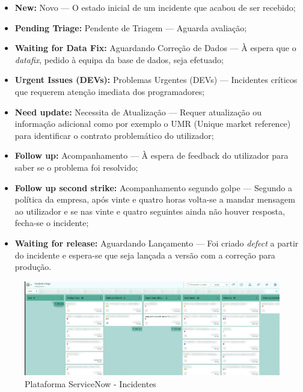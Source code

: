             \begin{itemize}
                \item \textbf{New:} Novo — O estado inicial de um incidente que acabou de ser recebido;
                \item \textbf{Pending Triage:} Pendente de Triagem — Aguarda avaliação;
                \item \textbf{Waiting for Data Fix:} Aguardando Correção de Dados — À espera que o \textit{datafix}, pedido à equipa da base de dados, seja efetuado;
                \item \textbf{Urgent Issues (DEVs):} Problemas Urgentes (DEVs) — Incidentes críticos que requerem atenção imediata dos programadores;
                \item \textbf{Need update:} Necessita de Atualização — Requer atualização ou informação adicional como por exemplo o UMR (Unique market reference) para identificar o contrato problemático do utilizador;
                \item \textbf{Follow up:} Acompanhamento — À espera de feedback do utilizador para saber se o problema foi resolvido;
                \item \textbf{Follow up second strike:} Acompanhamento segundo golpe — Segundo a política da empresa, após vinte e quatro horas volta-se a mandar mensagem ao utilizador e se nas vinte e quatro seguintes ainda não houver resposta, fecha-se o incidente;
                \item \textbf{Waiting for release:} Aguardando Lançamento — Foi criado \textit{defect} a partir do incidente e espera-se que seja lançada a versão com a correção para produção.
            \end{itemize}
            
            \begin{figure}[htbp]
                \centering
                \includegraphics[width=\textwidth]{imgs/ServiceNow2.png}
                \caption{Plataforma ServiceNow - Incidentes}\label{fig:servicenow-ui2}
            \end{figure}

